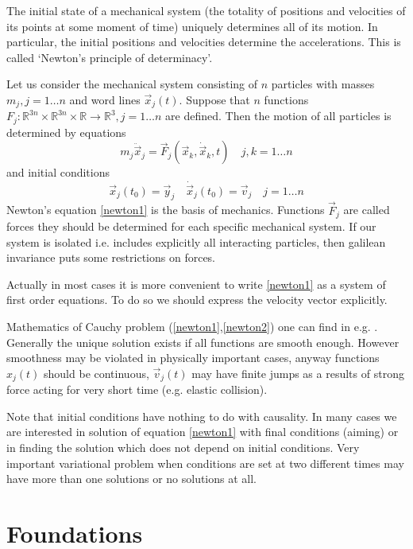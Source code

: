 \documentclass[11pt]{book}
\begin{document}
The initial state of a mechanical system (the totality of positions and
velocities of its points at some moment of time) uniquely determines all of
its motion. In particular, the initial positions and velocities determine the accelerations.
This is called `Newton's principle of determinacy'.

Let us consider the mechanical system consisting of $n$ particles 
with masses $m_j,j=1\ldots n$ and word lines $\vec x_j(t)$.
Suppose that $n$ functions  
$F_j:\mathbb{R}^{3 n}\times\mathbb{R}^{3 n}\times\mathbb{R}\rightarrow\mathbb{R}^3,j=1\ldots n$ 
are defined. Then the motion of all particles is determined by equations
\begin{equation}
    m_j \ddot \vec x_j=\vec F_j(\vec x_k,\dot \vec x_k,t) \quad j,k=1\ldots n \label {newton1}
\end{equation}
and initial conditions
\begin{equation}
    \vec x_j(t_0)=\vec y_j\quad\dot \vec x_j(t_0)=\vec v_j  \quad j=1\ldots n \label {newton2}
\end{equation}
Newton's equation \eqref{newton1} is  the basis of mechanics. Functions $\vec F_j$
are called forces they should be determined  for each specific mechanical system. If our system
is isolated i.e. includes explicitly all interacting particles, then galilean invariance puts some restrictions on forces.

Actually in most cases it is more convenient to write
\eqref{newton1} as a system of first order equations. 
To do so we should express the  velocity vector explicitly.

Mathematics of  Cauchy problem (\ref{newton1},\ref{newton2}) 
one can find in e.g. \cite{arnold-ode}. Generally the unique solution exists if
all functions are smooth enough. However smoothness may be violated in physically
important cases, anyway functions $x_j(t)$ should be continuous, $\vec v_j(t)$ may
have finite jumps as a results of strong force acting for very short time (e.g. 
elastic collision).

Note that initial conditions have nothing to do with causality. In many cases we are
interested in solution of equation \eqref{newton1} with final 
conditions (aiming) or in finding the solution which does not 
depend on initial conditions. Very important variational problem when
conditions are set at two different times may have more than one solutions
or no solutions at all.

\section{Foundations}
\label{cm-foundations}
\end{document}
